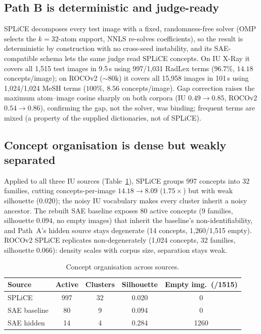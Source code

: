 \documentclass[sigconf, nonacm]{acmart}
\begin{document}
\subsection{Path B is deterministic and judge-ready}
\label{sec:pathb}
SPLiCE decomposes every test image with a fixed, randomness-free solver (OMP selects the $k{=}32$-atom support, NNLS re-solves coefficients), so the result is deterministic by construction with no cross-seed instability, and its SAE-compatible schema lets the same judge read SPLiCE concepts. On IU X-Ray it covers all 1,515 test images in 9.5\,s using 997/1,031 RadLex terms ($96.7\%$, $14.18$ concepts/image); on ROCOv2 (${\sim}80$k) it covers all 15,958 images in 101\,s using 1,024/1,024 MeSH terms ($100\%$, $8.56$ concepts/image). Gap correction raises the maximum atom--image cosine sharply on both corpora (IU $0.49{\to}0.85$, ROCOv2 $0.54{\to}0.86$), confirming the gap, not the solver, was binding; frequent terms are mixed (a property of the supplied dictionaries, not of SPLiCE).

\subsection{Concept organisation is dense but weakly separated}
Applied to all three IU sources (Table~\ref{tab:org}), SPLiCE groups 997 concepts into 32 families, cutting concepts-per-image $14.18{\to}8.09$ ($1.75{\times}$) but with weak silhouette ($0.020$); the noisy IU vocabulary makes every cluster inherit a noisy ancestor. The rebuilt SAE baseline exposes 80 active concepts (9 families, silhouette $0.094$, no empty images) that inherit the baseline's non-identifiability, and Path~A's hidden source stays degenerate (14 concepts, 1{,}260/1,515 empty). ROCOv2 SPLiCE replicates non-degenerately (1{,}024 concepts, 32 families, silhouette $0.066$): density scales with corpus size, separation stays weak.

\begin{table}[t]
\caption{Concept organisation across sources.}
\label{tab:org}
\small
\begin{tabular}{lcccc}
\toprule
Source & Active & Clusters & Silhouette & Empty img.\ (/1515) \\
\midrule
SPLiCE & 997 & 32 & 0.020 & 0 \\
SAE baseline & 80 & 9 & 0.094 & 0 \\
SAE hidden & 14 & 4 & 0.284 & 1260 \\
\bottomrule
\end{tabular}
\end{table}
\end{document}
